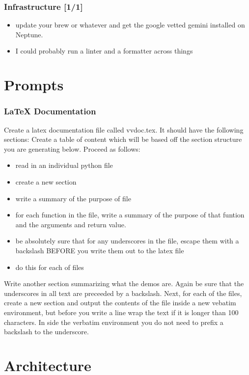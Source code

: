 \documentclass[11pt]{article}
\begin{document}
\subsubsection{Infrastructure [1/1]}
\label{sec:org96d3c1c}
\begin{itemize}
\item[{$\boxtimes$}] update your brew or whatever and get the google vetted gemini installed on
Neptune.
\item[{$\square$}] I could probably run a linter and a formatter across things
\end{itemize}

\section{Prompts}
\label{sec:org5fd0bdf}

\subsubsection{\LaTeX{} Documentation}
\label{sec:org7b69d71}
Create a latex documentation file called vvdoc.tex. It should have the following sections:
Create a table of content which will be based off the section structure
you are generating below.
Proceed as follows:
\begin{itemize}
\item read in an individual python file
\item create a new section
\item write a summary of the purpose of file
\item for each function in the file, write a summary of the purpose of that
funtion and the arguments and return value.
\item be absolutely sure that for any underscores in the file, escape them with
a backslash BEFORE you write them out to the latex file
\item do this for each of files
\end{itemize}
Write another section summarizing what the demos are. Again be sure
that the underscores in all text are preceeded by a backslash.
Next, for each of the files, create a new section and output
the contents of the file inside a new vebatim environment,
but before you write a line wrap the text if it is longer than
100 characters. In side the verbatim environment you do not need to
prefix a backslash to the underscore.


\section{Architecture}
\label{sec:org613f1d8}
\end{document}
